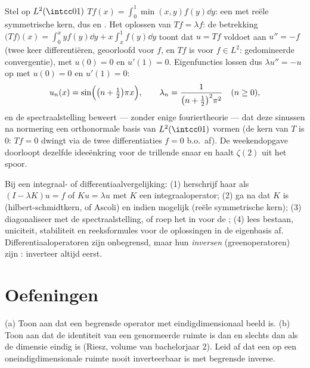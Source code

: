 \begin{example}\label{ex:b3:spectral:minxy}
Stel op $L^2(\intcc01)$ $Tf(x) = \int_0^1\min(x, y)f(y)\dd y$:
een  met reële symmetrische kern, dus
 en . Het oplossen van $Tf = \lambda f$: de
betrekking $\bigl(Tf\bigr)(x) = \int_0^xyf(y)\dd y +
x\int_x^1f(y)\dd y$ toont dat $u = Tf$ voldoet aan $u'' = -f$
(twee keer differentiëren, geoorloofd voor  $f$, en $Tf$
is  voor $f \in L^2$: gedomineerde convergentie), met
$u(0) = 0$ en $u'(1) = 0$. Eigenfuncties lossen dus $\lambda u''
= -u$ op met $u(0) = 0$ en $u'(1) = 0$:
\[
u_n(x) = \sin\Bigl(\bigl(n + \tfrac12\bigr)\pi x\Bigr),
\qquad
\lambda_n = \frac{1}{\bigl(n + \frac12\bigr)^2\pi^2}
\quad (n \geq 0),
\]
en de spectraalstelling beweert --- zonder enige fouriertheorie
--- dat deze sinussen na normering een orthonormale basis van
$L^2(\intcc01)$ vormen (de kern van $T$ is $0$: $Tf = 0$ dwingt
via de twee differentiaties $f = 0$ b.o.\ af). De weekendopgave
doorloopt dezelfde ideeënkring voor de trillende snaar en haalt
$\zeta(2)$ uit het spoor.
\end{example}

\begin{method}\label{met:b3:spectral:method}
Bij een integraal- of differentiaalvergelijking: (1) herschrijf
haar als $(I - \lambda K)u = f$ of $Ku = \lambda u$ met $K$ een
integraaloperator; (2) ga na dat $K$  is
(hilbert-schmidtkern, of Ascoli) en indien mogelijk
 (reële symmetrische kern); (3) diagonaliseer met
de spectraalstelling, of roep het  in
voor de ; (4) lees bestaan, uniciteit, stabiliteit
en reeksformules voor de oplossingen in de eigenbasis af.
Differentiaaloperatoren zijn onbegrensd, maar hun \emph{inversen}
(greenoperatoren) zijn : inverteer altijd eerst.
\end{method}

\section{Oefeningen}

\begin{exercise}[$\star$]\label{exo:b3:spectral:1}
(a) Toon aan dat een begrensde operator met eindigdimensionaal
beeld  is.
(b) Toon aan dat de identiteit van een genormeerde ruimte 
is dan en slechts dan als de dimensie eindig is (Riesz, volume
van bachelorjaar 2). Leid af dat een  op een
oneindigdimensionale ruimte nooit inverteerbaar is met begrensde
inverse.
\end{exercise}

